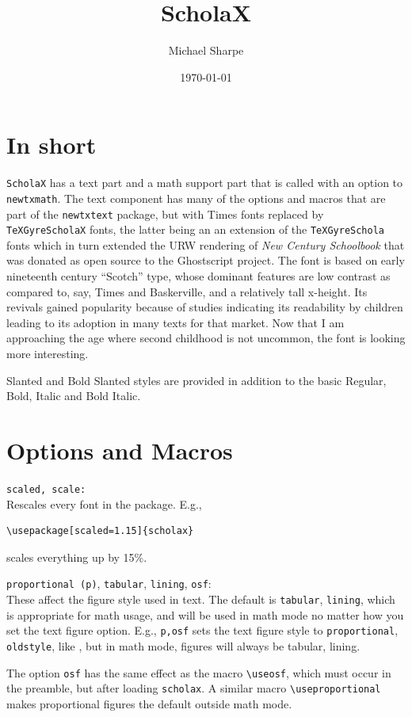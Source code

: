 \documentclass[11pt]{article}
\title{ScholaX}
\author{Michael Sharpe}
\date{\today}  %
\theoremstyle{oldplain}
\theoremstyle{plain}
\begin{document}
\maketitle
\section*{In short}

{\tt ScholaX} has a text part and a math support part that is called with an option to {\tt newtxmath}. The text component has many of the options and macros that are part of the {\tt newtxtext} package, but with Times fonts replaced by {\tt TeXGyreScholaX} fonts, the latter being an an extension of the {\tt TeXGyreSchola} fonts which in turn extended the URW rendering of \emph{New Century Schoolbook} that was donated as open source to the Ghostscript project. The font is based on early nineteenth century ``Scotch'' type, whose dominant features are low contrast as compared to, say, Times and Baskerville, and a relatively tall x-height. Its revivals gained popularity because of studies indicating its readability by children leading to its adoption in many texts for that market. Now that I am approaching the age where second childhood is not uncommon, the font is looking more interesting.

Slanted and Bold Slanted styles are provided in addition to the basic Regular, Bold, Italic and Bold Italic.


\section*{Options and Macros}
{\tt scaled, scale:}\\
Rescales every font in the package. E.g.,
\begin{verbatim}
\usepackage[scaled=1.15]{scholax}
\end{verbatim}
scales everything up by 15\%.

{\tt proportional (p)}, {\tt tabular}, {\tt lining}, {\tt osf}:\\
These affect the figure style used in text. The default is {\tt tabular}, {\tt lining}, which is appropriate for math usage, and will be used in math mode no matter how you set the text figure option. E.g., {\tt p,osf} sets the text figure style to {\tt proportional}, {\tt oldstyle}, like , but in math mode, figures will always be tabular, lining. 

The option {\tt osf} has the same effect as the macro \verb|\useosf|, which must occur in the preamble, but after loading {\tt scholax}. A similar macro \verb|\useproportional| makes proportional figures the default outside math mode.
\end{document}
